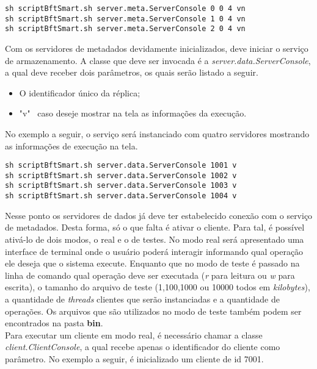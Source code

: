 \begin{lstlisting}
sh scriptBftSmart.sh server.meta.ServerConsole 0 0 4 vn
sh scriptBftSmart.sh server.meta.ServerConsole 1 0 4 vn
sh scriptBftSmart.sh server.meta.ServerConsole 2 0 4 vn
\end{lstlisting}

Com os servidores de metadados devidamente inicializados, deve iniciar o serviço de armazenamento. A classe que deve ser invocada é a \textit{server.data.ServerConsole}, a qual deve receber dois parâmetros, os quais serão listado a seguir. 

\begin{itemize}
	\item O identificador único da réplica;
	\item "v" ~caso deseje mostrar na tela as informações da execução.
\end{itemize}

No exemplo a seguir, o serviço será instanciado com quatro servidores mostrando as informações de execução na tela.
\\

\begin{lstlisting}
sh scriptBftSmart.sh server.data.ServerConsole 1001 v
sh scriptBftSmart.sh server.data.ServerConsole 1002 v
sh scriptBftSmart.sh server.data.ServerConsole 1003 v
sh scriptBftSmart.sh server.data.ServerConsole 1004 v
\end{lstlisting}

Nesse ponto os servidores de dados já deve ter estabelecido conexão com o serviço de metadados. Desta forma, só o que falta é ativar o cliente. Para tal, é possível ativá-lo de dois modos, o real e o de testes. No modo real será apresentado uma interface de terminal onde o usuário poderá interagir informando qual operação ele deseja que o sistema execute. Enquanto que no modo de teste é passado na linha de comando qual operação deve ser executada (\textit{r} para leitura ou \textit{w} para escrita), o tamanho do arquivo de teste (1,100,1000 ou 10000 todos em \textit{kilobytes}), a quantidade de \textit{threads} clientes que serão instanciadas e a quantidade de operações. Os arquivos que são utilizados no modo de teste também podem ser encontrados na pasta \textbf{bin}.
\\


Para executar um cliente em modo real, é necessário chamar a classe \textit{client.ClientConsole}, a qual recebe apenas o identificador do cliente como parâmetro. No exemplo a seguir, é inicializado um cliente de id 7001.
\\

